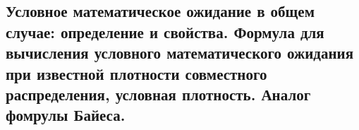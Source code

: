 \subsection{Условное математическое ожидание в общем случае: определение и свойства. Формула для вычисления условного математического ожидания при известной плотности совместного распределения, условная плотность. Аналог фомрулы Байеса.}